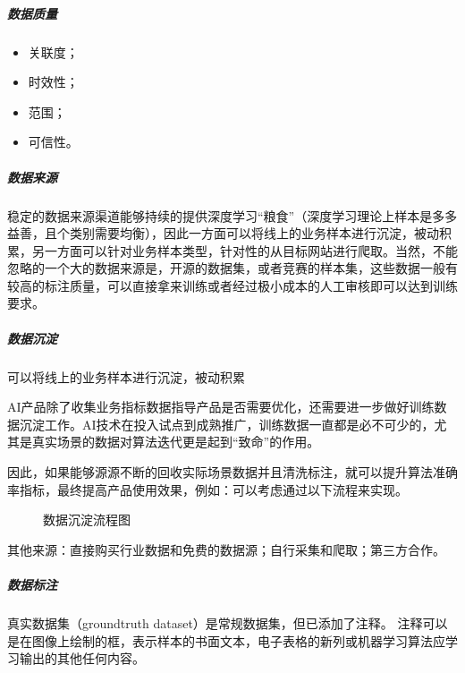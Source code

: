 \documentclass[letterpaper,10pt,english]{sphinxmanual}
\begin{document}
\subparagraph{数据质量}
\label{\detokenize{chapter_idea/data:id14}}\begin{itemize}
\item {} 
关联度；

\item {} 
时效性；

\item {} 
范围；

\item {} 
可信性。

\end{itemize}


\subparagraph{数据来源}
\label{\detokenize{chapter_idea/data:id15}}
稳定的数据来源渠道能够持续的提供深度学习“粮食”（深度学习理论上样本是多多益善，且个类别需要均衡），因此一方面可以将线上的业务样本进行沉淀，被动积累，另一方面可以针对业务样本类型，针对性的从目标网站进行爬取。当然，不能忽略的一个大的数据来源是，开源的数据集，或者竞赛的样本集，这些数据一般有较高的标注质量，可以直接拿来训练或者经过极小成本的人工审核即可以达到训练要求。


\subparagraph{数据沉淀}
\label{\detokenize{chapter_idea/data:id16}}
可以将线上的业务样本进行沉淀，被动积累

AI产品除了收集业务指标数据指导产品是否需要优化，还需要进一步做好训练数据沉淀工作。AI技术在投入试点到成熟推广，训练数据一直都是必不可少的，尤其是真实场景的数据对算法迭代更是起到“致命”的作用。

因此，如果能够源源不断的回收实际场景数据并且清洗标注，就可以提升算法准确率指标，最终提高产品使用效果，例如：可以考虑通过以下流程来实现。

\begin{figure}[H]
\centering
\capstart

\noindent{}
\caption{数据沉淀流程图}\label{\detokenize{chapter_idea/data:id29}}\end{figure}

其他来源：直接购买行业数据和免费的数据源；自行采集和爬取；第三方合作。


\subparagraph{数据标注}
\label{\detokenize{chapter_idea/data:id17}}
真实数据集（ground\sphinxhyphen{}truth dataset）是常规数据集，但已添加了注释。
注释可以是在图像上绘制的框，表示样本的书面文本，电子表格的新列或机器学习算法应学习输出的其他任何内容。%
\begin{footnote}[381]\sphinxAtStartFootnote
{}
%
\end{footnote}
\end{document}
